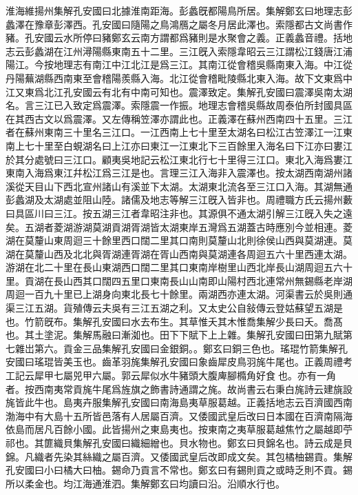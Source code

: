 淮海維揚州集解孔安國曰北據淮南距海。彭蠡旣都陽鳥所居。集解鄭玄曰地理志彭蠡澤在豫章彭澤西。孔安國曰隨陽之鳥鴻鴈之屬冬月居此澤也。索隱都古文尚書作豬。孔安國云水所停曰豬鄭玄云南方謂都爲豬則是水聚會之義。正義蠡音禮。括地志云彭蠡湖在江州潯陽縣東南五十二里。三江旣入索隱韋昭云三江謂松江錢唐江浦陽江。今按地理志有南江中江北江是爲三江。其南江從會稽吳縣南東入海。中江從丹陽蕪湖縣西南東至會稽陽羨縣入海。北江從會稽毗陵縣北東入海。故下文東爲中江又東爲北江孔安國云有北有中南可知也。震澤致定。集解孔安國曰震澤吳南太湖名。言三江已入致定爲震澤。索隱震一作振。地理志會稽吳縣故周泰伯所封國具區在其西古文以爲震澤。又左傳稱笠澤亦謂此也。正義澤在蘇州西南四十五里。三江者在蘇州東南三十里名三江口。一江西南上七十里至太湖名曰松江古笠澤江一江東南上七十里至白蜆湖名曰上江亦曰東江一江東北下三百餘里入海名曰下江亦曰婁江於其分處號曰三江口。顧夷吳地記云松江東北行七十里得三江口。東北入海爲婁江東南入海爲東江幷松江爲三江是也。言理三江入海非入震澤也。按太湖西南湖州諸溪從天目山下西北宣州諸山有溪並下太湖。太湖東北流各至三江口入海。其湖無通彭蠡湖及太湖處並阻山陸。諸儒及地志等解三江旣入皆非也。周禮職方氏云揚州藪曰具區川曰三江。按五湖三江者韋昭注非也。其源俱不通太湖引解三江旣入失之遠矣。五湖者菱湖游湖莫湖貢湖胥湖皆太湖東岸五灣爲五湖蓋古時應別今並相連。菱湖在莫釐山東周迴三十餘里西口闊二里其口南則莫釐山北則徐侯山西與莫湖連。莫湖在莫釐山西及北北與胥湖連胥湖在胥山西南與莫湖連各周迴五六十里西連太湖。游湖在北二十里在長山東湖西口闊二里其口東南岸樹里山西北岸長山湖周迴五六十里。貢湖在長山西其口闊四五里口東南長山山南即山陽村西北連常州無錫縣老岸湖周迴一百九十里已上湖身向東北長七十餘里。兩湖西亦連太湖。河渠書云於吳則通渠三江五湖。貨殖傳云夫吳有三江五湖之利。又太史公自敍傳云登姑蘇望五湖是也。竹箭旣布。集解孔安國曰水去布生。其草惟夭其木惟喬集解少長曰夭。喬髙也。其土塗泥。集解馬融曰漸洳也。田下下賦下上上雜。集解孔安國曰田第九賦第七雜岀第六。貢金三品集解孔安國曰金銀銅。。鄭玄曰銅三色也。瑤琨竹箭集解孔安國曰瑤琨皆美玉也。齒革羽旄集解孔安國曰象齒犀皮鳥羽旄牛尾也。正義周禮考工記云犀甲七屬兕甲六屬。郭云犀似水牛豬頭大腹庳腳橢角好食𣗥也。亦有一角者。按西南夷常貢旄牛尾爲旌旗之飾書詩通謂之旄。故尚書云右秉白旄詩云建旐設旄皆此牛也。島夷卉服集解孔安國曰南海島夷草服葛越。正義括地志云百濟國西南渤海中有大島十五所皆邑落有人居屬百濟。又倭國武皇后改曰日本國在百濟南隔海依島而居凡百餘小國。此皆揚州之東島夷也。按東南之夷草服葛越焦竹之屬越即苧祁也。其篚織貝集解孔安國曰織細繒也。貝水物也。鄭玄曰貝錦名也。詩云成是貝錦。凡織者先染其絲織之屬百濟。又倭國武皇后改即成文矣。其包橘柚錫貢。集解孔安國曰小曰橘大曰柚。錫命乃貢言不常也。鄭玄曰有錫則貢之或時乏則不貢。錫所以柔金也。均江海通淮泗。集解鄭玄曰均讀曰沿。沿順水行也。

